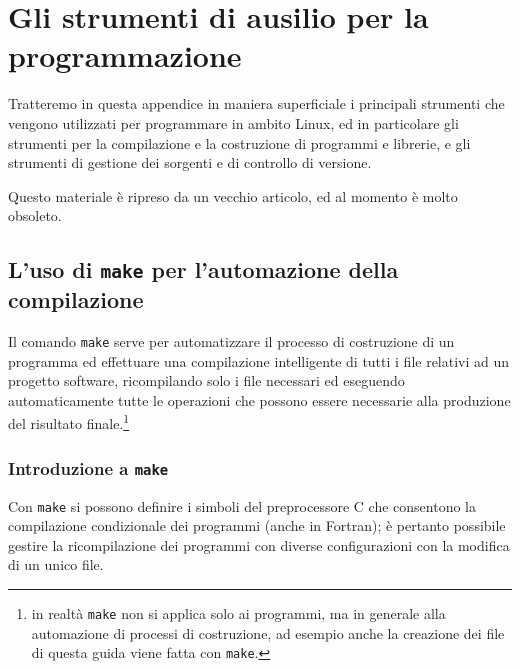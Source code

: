 
\chapter{Gli strumenti di ausilio per la programmazione}
\label{cha:build_manage}

Tratteremo in questa appendice in maniera superficiale i principali strumenti
che vengono utilizzati per programmare in ambito Linux, ed in particolare gli
strumenti per la compilazione e la costruzione di programmi e librerie, e gli
strumenti di gestione dei sorgenti e di controllo di versione.

Questo materiale è ripreso da un vecchio articolo, ed al momento è molto
obsoleto.


\section{L'uso di \texttt{make} per l'automazione della compilazione}
\label{sec:build_make}

Il comando \texttt{make} serve per automatizzare il processo di costruzione di
un programma ed effettuare una compilazione intelligente di tutti i file
relativi ad un progetto software, ricompilando solo i file necessari ed
eseguendo automaticamente tutte le operazioni che possono essere necessarie
alla produzione del risultato finale.\footnote{in realtà \texttt{make} non si
  applica solo ai programmi, ma in generale alla automazione di processi di
  costruzione, ad esempio anche la creazione dei file di questa guida viene
  fatta con \texttt{make}.}


\subsection {Introduzione a \texttt{make}}
\label{sec:make_intro}

Con \texttt{make} si possono definire i simboli del preprocessore C che
consentono la compilazione condizionale dei programmi (anche in Fortran); è
pertanto possibile gestire la ricompilazione dei programmi con diverse
configurazioni con la modifica di un unico file.


